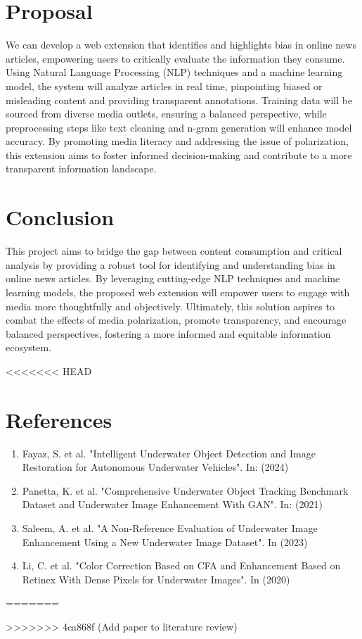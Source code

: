 \documentclass{article}
\begin{document}
\section{Proposal}
We can develop a web extension that identifies and highlights bias in online news articles, empowering users to critically evaluate the information they consume. Using  Natural Language Processing (NLP) techniques and a machine learning model, the system will analyze articles in real time, pinpointing biased or misleading content and providing transparent annotations. Training data will be sourced from diverse media outlets, ensuring a balanced perspective, while preprocessing steps like text cleaning and n-gram generation will enhance model accuracy. By promoting media literacy and addressing the issue of polarization, this extension aims to foster informed decision-making and contribute to a more transparent information landscape.

\section{Conclusion}
This project aims to bridge the gap between content consumption and critical analysis by providing a robust tool for identifying and understanding bias in online news articles. By leveraging cutting-edge NLP techniques and machine learning models, the proposed web extension will empower users to engage with media more thoughtfully and objectively. Ultimately, this solution aspires to combat the effects of media polarization, promote transparency, and encourage balanced perspectives, fostering a more informed and equitable information ecosystem.

<<<<<<< HEAD
\section*{References}
\begin{enumerate}
    \item Fayaz, S. et al. "Intelligent Underwater Object Detection and Image Restoration for Autonomous Underwater Vehicles". In: (2024)

    \item Panetta, K. et al. "Comprehensive Underwater Object Tracking Benchmark Dataset and Underwater Image Enhancement With GAN". In: (2021)

    \item Saleem, A. et al. "A Non-Reference Evaluation of Underwater Image Enhancement Using a New Underwater Image Dataset". In (2023)

    \item Li, C. et al. "Color Correction Based on CFA and Enhancement Based on Retinex With Dense Pixels for Underwater Images". In (2020)


\end{enumerate}
=======
\nocite{*}


>>>>>>> 4ca868f (Add paper to literature review)
\end{document}
